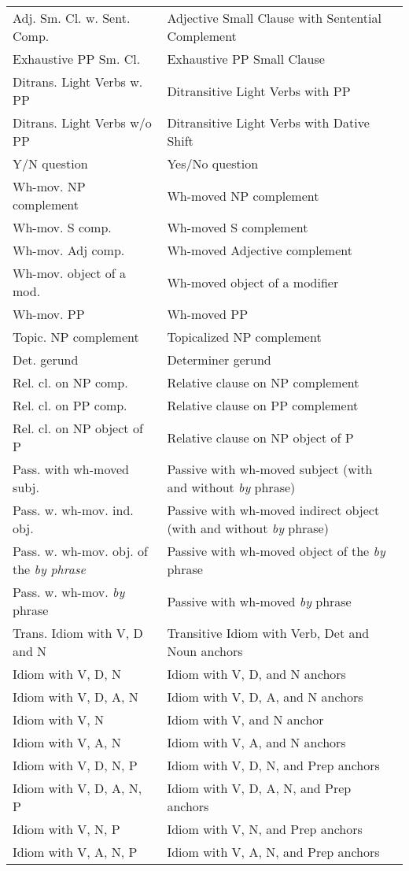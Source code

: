 \begin{tabular}{ll}
Adj. Sm. Cl. w. Sent. Comp.&Adjective Small Clause with Sentential
Complement\\
Exhaustive PP Sm. Cl.&Exhaustive PP Small Clause\\
Ditrans. Light Verbs w. PP&Ditransitive Light Verbs with PP\\
Ditrans. Light Verbs w/o PP&Ditransitive Light Verbs with Dative Shift\\
Y/N question&Yes/No question \\
Wh-mov. NP complement&Wh-moved NP complement \\
Wh-mov. S comp.&Wh-moved S complement \\
Wh-mov. Adj comp.&Wh-moved Adjective complement \\
Wh-mov. object of a mod.&Wh-moved object of a modifier \\
Wh-mov. PP&Wh-moved PP \\
Topic. NP complement&Topicalized NP complement \\
Det. gerund&Determiner gerund \\
Rel. cl. on NP comp.&Relative clause on NP complement \\
Rel. cl. on PP comp.& Relative clause on PP complement\\
Rel. cl. on NP object of P& Relative clause on NP object of P\\
Pass. with wh-moved subj.&Passive with wh-moved subject (with and without {\it by} phrase) \\
Pass. w. wh-mov. ind. obj.&Passive with wh-moved indirect object (with and without {\it by} phrase) \\
Pass. w. wh-mov. obj. of the {\it {\it by} phrase}&Passive with wh-moved object of the {\it by} phrase \\
Pass. w. wh-mov. {\it by} phrase&Passive with wh-moved {\it by} phrase \\
Trans. Idiom with V, D and N & Transitive Idiom with Verb, Det and
Noun anchors\\
Idiom with V, D, N & Idiom with V, D, and N anchors \\
Idiom with V, D, A, N & Idiom with V, D, A, and N anchors \\
Idiom with V, N & Idiom with V, and N anchor \\
Idiom with V, A, N & Idiom with V, A, and N anchors \\
Idiom with V, D, N, P & Idiom with V, D, N, and Prep anchors \\
Idiom with V, D, A, N, P & Idiom with V, D, A, N, and Prep anchors \\
Idiom with V, N, P & Idiom with V, N, and Prep anchors \\
Idiom with V, A, N, P & Idiom with V, A, N, and Prep anchors 
\end{tabular}
\normalsize

